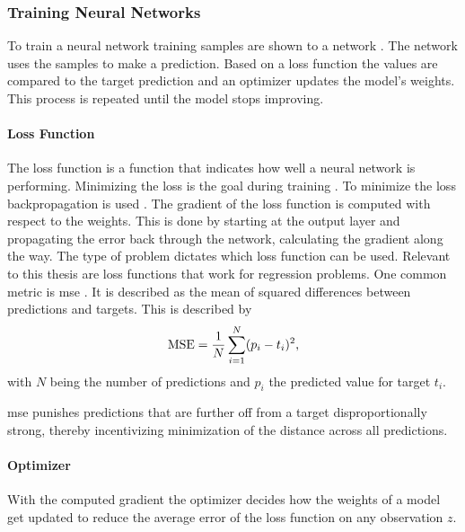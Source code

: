 \subsubsection{Training Neural Networks}
\label{sec:Foundations:NeuralNetworks:Training}

To train a neural network training samples are shown to a network \cite{nielsen2015neural}. The network uses the samples to make a prediction. Based on a loss function the values are compared to the target prediction and an optimizer updates the model's weights. This process is repeated until the model stops improving.


\paragraph{Loss Function}
\label{par:Foundations:NeuralNetworks:Training:Loss}

The loss function is a function that indicates how well a neural network is performing. Minimizing the loss is the goal during training \cite{teuwen2020convolutional}. To minimize the loss backpropagation is used \cite{nielsen2015neural}. The gradient of the loss function is computed with respect to the weights. This is done by starting at the output layer and propagating the error back through the network, calculating the gradient along the way. The type of problem dictates which loss function can be used. Relevant to this thesis are loss functions that work for regression problems. One common metric is \ac{mse} \cite{goodfellow2016deep}. It is described as the mean of squared differences between predictions and targets. This is described by \begin{equation} \mathrm{MSE} = \frac{1}{N} \sum_{i=1}^N (p_i - t_i)^2 \text{,} \end{equation} with $N$ being the number of predictions and $p_i$ the predicted value for target $t_i$.

\Ac{mse} punishes predictions that are further off from a target disproportionally strong, thereby incentivizing minimization of the distance across all predictions.


\paragraph{Optimizer}
\label{par:Foundations:NeuralNetworks:Training:Optimizer}

With the computed gradient the optimizer decides how the weights of a model get updated to reduce the average error of the loss function on any observation $z$.

